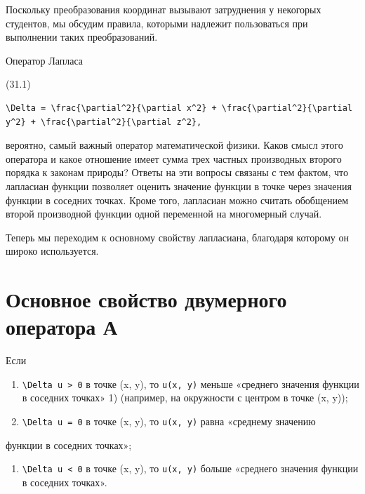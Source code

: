 \documentclass[
  ukrainian,
]{article}
\providecommand{\tightlist}{%
  \setlength{\itemsep}{0pt}\setlength{\parskip}{0pt}}
\begin{document}
Поскольку преобразования координат вызывают затруднения у некогорых
студентов, мы обсудим правила, которыми надлежит пользоваться при
выполнении таких преобразований.

Оператор Лапласа

(31.1)

\begin{verbatim}
\Delta = \frac{\partial^2}{\partial x^2} + \frac{\partial^2}{\partial y^2} + \frac{\partial^2}{\partial z^2},
\end{verbatim}

вероятно, самый важный оператор математической физики. Каков смысл этого
оператора и какое отношение имеет сумма трех частных производных второго
порядка к законам природы? Ответы на эти вопросы связаны с тем фактом,
что лапласиан функции позволяет оценить значение функции в точке через
значения функции в соседних точках. Кроме того, лапласиан можно считать
обобщением второй производной функции одной переменной на многомерный
случай.

Теперь мы переходим к основному свойству лапласиана, благодаря которому
он широко используется.

\section{Основное свойство двумерного оператора
А}\label{ux43eux441ux43dux43eux432ux43dux43eux435-ux441ux432ux43eux439ux441ux442ux432ux43e-ux434ux432ux443ux43cux435ux440ux43dux43eux433ux43e-ux43eux43fux435ux440ux430ux442ux43eux440ux430-ux430}

Если

\begin{enumerate}
\def\labelenumi{\arabic{enumi}.}
\item
  \texttt{\textbackslash{}Delta\ u\ \textgreater{}\ 0} в точке (x, y),
  то \texttt{u(x,\ y)} меньше «среднего значения функции в соседних
  точках» 1) (например, на окружности с центром в точке (x, y));
\item
  \texttt{\textbackslash{}Delta\ u\ =\ 0} в точке (x, y), то
  \texttt{u(x,\ y)} равна «среднему значению
\end{enumerate}

функции в соседних точках»;

\begin{enumerate}
\def\labelenumi{\arabic{enumi}.}
\setcounter{enumi}{2}
\tightlist
\item
  \texttt{\textbackslash{}Delta\ u\ \textless{}\ 0} в точке (x, y), то
  \texttt{u(x,\ y)} больше «среднего значения функции в соседних
  точках».
\end{enumerate}
\end{document}
